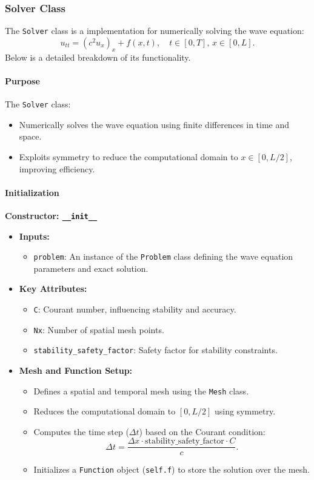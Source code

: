 \documentclass{article}
\begin{document}
				
		\subsubsection{Solver Class}
			
			The \texttt{Solver} class is a implementation for numerically solving the wave equation:
			\[
			u_{tt} = (c^2 u_x)_x + f(x, t), \quad t \in [0, T], \, x \in [0, L].
			\]
			Below is a detailed breakdown of its functionality.
			
			\paragraph{Purpose}
			The \texttt{Solver} class:
			\begin{itemize}
				\item Numerically solves the wave equation using finite differences in time and space.
				\item Exploits symmetry to reduce the computational domain to \( x \in [0, L/2] \), improving efficiency.
			\end{itemize}
			
			\paragraph{Initialization}
			\textbf{Constructor: \texttt{\_\_init\_\_}}
			\begin{itemize}
				\item \textbf{Inputs:}
				\begin{itemize}
					\item \texttt{problem}: An instance of the \texttt{Problem} class defining the wave equation parameters and exact solution.
				\end{itemize}
				\item \textbf{Key Attributes:}
				\begin{itemize}
					\item \texttt{C}: Courant number, influencing stability and accuracy.
					\item \texttt{Nx}: Number of spatial mesh points.
					\item \texttt{stability\_safety\_factor}: Safety factor for stability constraints.
				\end{itemize}
				\item \textbf{Mesh and Function Setup:}
				\begin{itemize}
					\item Defines a spatial and temporal mesh using the \texttt{Mesh} class.
					\item Reduces the computational domain to \( [0, L/2] \) using symmetry.
					\item Computes the time step (\( \Delta t \)) based on the Courant condition:
					\[
					\Delta t = \frac{\Delta x \cdot \text{stability\_safety\_factor} \cdot C}{c}.
					\]
					\item Initializes a \texttt{Function} object (\texttt{self.f}) to store the solution over the mesh.
				\end{itemize}
			\end{itemize}
			
\end{document}
